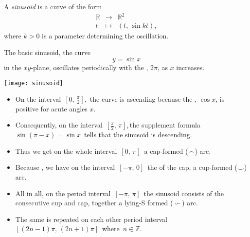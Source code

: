 \documentclass[12pt]{article}
\begin{document}
A \emph{sinusoid} is a curve of the form
\begin{eqnarray*}
  \mathbb{R}&\to& \mathbb{R}^2 \\
   t&\mapsto & (t,\,\sin{kt}),
\end{eqnarray*}
where $k>0$ is a parameter determining the oscillation.

The basic sinusoid, the curve 
          $$y  = \sin{x}$$
in the $xy$-plane, oscillates periodically with the , $2\pi$, as $x$ increases.
\begin{center}
\texttt{[image: sinusoid]}
\end{center}
\begin{itemize}
\item On the interval \,$[0,\,\frac{\pi}{2}]$,\, the curve is ascending because the , $\cos{x}$, is positive for acute angles $x$. 
\item Consequently, on the interval \,$[\frac{\pi}{2},\,\pi]$,\,the supplement formula \,$\sin{(\pi-x)} = \sin{x}$\, tells that the sinusoid is descending.
\item Thus we get on the whole interval \,$[0,\,\pi]$\, a cap-formed ($\smallfrown$) arc. 
\item Because , we have on the interval \,$[-\pi,\,0]$\, the  of the cap, a cup-formed ($\smallsmile$) arc.
\item All in all, on the period interval \,$[-\pi,\,\pi]$\, the sinusoid consists of the consecutive cup and cap, together a lying-S formed ($\backsim$) arc. 
\item The same is repeated on each other period interval \,$[(2n\!-\!1)\pi,\,(2n\!+\!1)\pi]$\, where \,$n\in\mathbb{Z}$.
\end{itemize}
\end{document}
